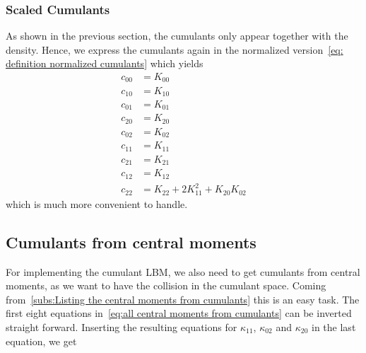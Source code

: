 \documentclass{article}
\begin{document}
\subsubsection{Scaled Cumulants}
\label{subs:Scaled Cumulants}

As shown in the previous section, the cumulants only appear together with the density. Hence, we express the cumulants again in the normalized version~\eqref{eq: definition normalized cumulants} which yields
\begin{align}
  \label{eq:all central moments from normalized cumulants}
  c_{00} & = K_{00} \\
  c_{10} & = K_{10} \\
  c_{01} & = K_{01} \\
  c_{20} & = K_{20} \\
  c_{02} & = K_{02} \\
  c_{11} & = K_{11} \\
  c_{21} & = K_{21} \\
  c_{12} & = K_{12} \\
  c_{22} & = K_{22} + 2K_{11}^2 + K_{20}K_{02}
\end{align}
which is much more convenient to handle.


\subsection{Cumulants from central moments}
\label{sub:Cumulants from central moments}

For implementing the cumulant LBM, we also need to get cumulants from central moments, as we want to have the collision in the cumulant space. Coming from~\ref{subs:Listing the central moments from cumulants} this is an easy task. The first eight equations in~\eqref{eq:all central moments from cumulants} can be inverted straight forward.
Inserting the resulting equations for $\kappa_{11}$, $\kappa_{02}$ and $\kappa_{20}$ in the last equation, we get
\end{document}
